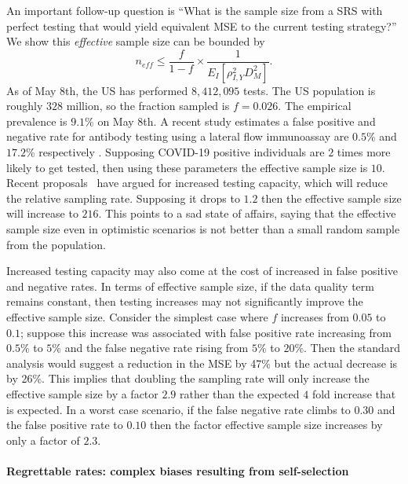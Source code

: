 \documentclass[12pt]{article}
\begin{document}
An important follow-up question is ``What is the sample size from a SRS with perfect testing that would yield equivalent MSE to the current testing strategy?'' We show this \emph{effective} sample size can be bounded by
$$
n_{eff} \le \frac{f}{1-f} \times \frac{1}{E_{I} \left[ \rho_{I,Y}^2 D_M^2 \right]}.
$$
As of May 8th, the US has performed $8,412,095$ tests.  The US population is roughly $328$ million, so the fraction sampled is $f = 0.026$.  The empirical prevalence is $9.1\%$ on May 8th. A recent study estimates a false positive and negative rate for antibody testing using a lateral flow immunoassay are $0.5$\% and $17.2$\% respectively \cite{Bendavid2020}. Supposing COVID-19 positive individuals are $2$ times more likely to get tested, then using these parameters the effective sample size is $10$.  Recent proposals~\cite{Siddarth2020} have argued for increased testing capacity, which will reduce the relative sampling rate.  Supposing it drops to $1.2$ then the effective sample size will increase to $216$.  This points to a sad state of affairs, saying that the effective sample size even in optimistic scenarios is not better than a small random sample from the population.

Increased testing capacity may also come at the cost of increased in false positive and negative rates.  In terms of effective sample size, if the data quality term remains constant, then testing increases may not significantly improve the effective sample size.  Consider the simplest case where $f$ increases from $0.05$ to $0.1$; suppose this increase was associated with  false positive rate increasing from $0.5$\% to $5$\% and the false negative rate rising from $5\%$ to $20$\%.  Then the standard analysis would suggest a reduction in the MSE by 47\% but the actual decrease is by 26\%.  This implies that doubling the sampling rate will only increase the effective sample size by a factor $2.9$ rather than the expected $4$ fold increase that is expected.  In a worst case scenario, if the false negative rate climbs to $0.30$ and the false positive rate to $0.10$ then the factor effective sample size increases by only a factor of $2.3$.

\paragraph*{Regrettable rates: complex biases resulting from self-selection}
\end{document}
